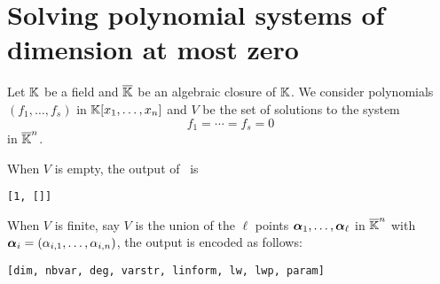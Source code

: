 \documentclass[a4paper,english,11pt]{scrartcl}
\theoremstyle{definition}
\theoremstyle{remark}
\begin{document}
\section{Solving polynomial systems of dimension at most zero}\label{sec:zerodim}

Let $\mathbb{K}$ be a field and $\overline{\mathbb{K}}$ be an algebraic closure of $\mathbb{K}$. We
consider polynomials $(f_1, \ldots, f_s)$  in $\mathbb{K}[x_1, \ldots,
x_n]$ and $V$ be the set of solutions to the system
\[
f_1=\cdots=f_s=0
\]
in $\overline{\mathbb{K}}^n$.

When $V$ is
empty,
the
output of \msolve~is
\begin{verbatim}
[1, []]
\end{verbatim}

When $V$ is finite, say $V$ is the union of the $\ell$ points $\bm{\alpha}_1,
\ldots, \bm{\alpha}_\ell$ in $\overline{\mathbb{K}}^n$ with $\bm{\alpha}_i = (\alpha_{i,1},
\ldots, \alpha_{i,n})$,
the
output is encoded as follows:
\begin{verbatim}
[dim, nbvar, deg, varstr, linform, lw, lwp, param]
\end{verbatim}
\end{document}
